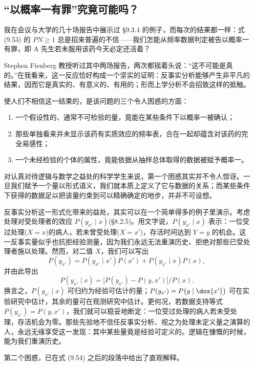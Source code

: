 \subsection{“以概率一有罪”究竟可能吗？}

我在会议与大学的几十场报告中展示过 \S9.3.4 的例子，而每次的结果都一样：式 \textup{(9.53)} 的 $PN\ge 1$ 总是招来普遍的不信——我们怎能从频率数据判定被告以概率一有罪，即 A 先生若未服用该药今天必定还活着？

Stephen Fienberg 教授听过其中两场报告，两次都摇着头说：“这不可能是真的。”在我看来，这一反应恰好构成一个坚实的证明：反事实分析能够产生非平凡的结果，因而它是真实的、有意义的、有用的；形而上学分析不会招致这样的抵触。

使人们不相信这一结果的，是该问题的三个令人困惑的方面：

\begin{enumerate}[label=\arabic*.,leftmargin=1.8em]
\item 一个假设性的、通常不可检验的量，竟能在某些条件下以概率一被确认；
\item 那些单独看来并未显示该药有实质效应的频率表，合在一起却蕴含对该药的完全易感性；
\item 一个未经检验的个体的属性，竟能依据从抽样总体取得的数据被赋予概率一。
\end{enumerate}

对认真对待逻辑与数学之益处的科学学生来说，第一个困惑其实并不令人惊讶。一旦我们赋予一个量以形式语义，我们就本质上定义了它与数据的关系；而某些条件下获得的数据足以把该量约束到可以精确确定的地步，并非不可设想。

反事实分析这一形式化带来的益处，其实可以在一个简单得多的例子里演示。考虑处理对受处理者的效应 $P(y_{x'}\mid x)$(\S8.2.5)。用文字说，$P(y_{x'}\mid x)$ 表示：一位受过处理($X=x$)的病人，若未曾受处理($X=x'$)，存活时间达到 $Y=y$ 的机会。这一反事实量似乎也抗拒经验测量，因为我们永远无法重演历史、拒绝对那些已受处理者施以处理。然而，对二值 $X$，我们可以写出
\[
P(y_{x'})=P(y_{x'}\mid x')P(x')+P(y_{x'}\mid x)P(x),
\]
并由此导出
\[
P(y_{x'}\mid x)=\bigl[P(y_{x'})-P(y,x')\bigr]/P(x).
\]
换言之，$P(y_{x'}\mid x)$ 可归约为经验可估计的量；$P(y_{x'})=P\bigl(y\mid\dox{x'}\bigr)$ 可在实验研究中估计，其余的量可在观测研究中估计。更何况，若数据支持等式 $P(y_{x'})=P(y,x')$，我们就可以稳妥地断定：一位受过处理的病人若未受处理，存活机会为零。那些先验地不信任反事实分析、视之为处理未定义量之演算的人，永远无缘享受这一发现：其中某些量竟是经验可定义的。逻辑在慷慨的时候，能为我们重演历史。

第二个困惑，已在式 \textup{(9.54)} 之后的段落中给出了直观解释。

